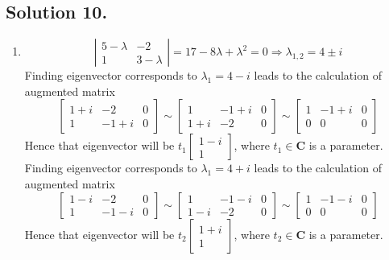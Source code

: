 \documentclass{article}
\begin{document}
\subsection*{Solution 10.}
\begin{enumerate} [label=(\arabic*)]
    \item 
    \[\left\vert\begin{array}{rr}
    5-\lambda & -2 \\
    1 & 3-\lambda 
    \end{array}\right\vert=17-8\lambda+\lambda^2=0\Rightarrow \lambda_{1,2}=4\pm i\]
    Finding eigenvector corresponds to $\lambda_1=4-i$ leads to the calculation of augmented matrix 
    \[\left[\begin{array}{rrr}
    1+i & -2 & 0 \\
    1 & -1+i & 0 
    \end{array}\right]\sim \left[\begin{array}{rrr}
    1 & -1+i & 0 \\
    1+i & -2 & 0 
    \end{array}\right]\sim \left[\begin{array}{rrr}
    1 & -1+i & 0 \\
    0 & 0 & 0 
    \end{array}\right]\]
    Hence that eigenvector will be $t_1\left[\begin{array}{r}
    1-i  \\ 1 \end{array}\right]$, where $t_1\in\mathbf{C}$ is a parameter.
    Finding eigenvector corresponds to $\lambda_1=4+i$ leads to the calculation of augmented matrix 
    \[\left[\begin{array}{rrr}
    1-i & -2 & 0 \\
    1 & -1-i & 0 
    \end{array}\right]\sim \left[\begin{array}{rrr}
    1 & -1-i & 0 \\
    1-i & -2 & 0 
    \end{array}\right]\sim \left[\begin{array}{rrr}
    1 & -1-i & 0 \\
    0 & 0 & 0 
    \end{array}\right]\]
    Hence that eigenvector will be $t_2\left[\begin{array}{r}
    1+i  \\ 1 \end{array}\right]$, where $t_2\in\mathbf{C}$ is a parameter.\newline

\end{enumerate}
\end{document}
